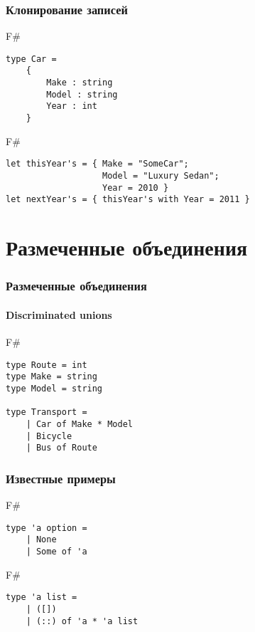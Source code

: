 \documentclass[xetex,mathserif,serif]{beamer}
\begin{document}
	\begin{frame}[fragile]
		\frametitle{Клонирование записей}
		\begin{exampleblock}{F\#}
			\begin{lstlisting}
type Car =
    {
        Make : string
        Model : string
        Year : int
    }
\end{lstlisting}
\end{exampleblock}
		
		\begin{exampleblock}{F\#}
			\begin{lstlisting}
let thisYear's = { Make = "SomeCar"; 
                   Model = "Luxury Sedan"; 
                   Year = 2010 }
let nextYear's = { thisYear's with Year = 2011 }
\end{lstlisting}
\end{exampleblock}
	
\end{frame}

	\section{Размеченные объединения}
	
	\begin{frame}[fragile]
		\frametitle{Размеченные объединения}
		\framesubtitle{Discriminated unions}
		\begin{exampleblock}{F\#}
			\begin{lstlisting}
type Route = int
type Make = string
type Model = string

type Transport =
    | Car of Make * Model
    | Bicycle
    | Bus of Route
\end{lstlisting}
\end{exampleblock}
		
\end{frame}

	\begin{frame}[fragile]
		\frametitle{Известные примеры}
		\begin{exampleblock}{F\#}
			\begin{lstlisting}
type 'a option =
    | None
    | Some of 'a
\end{lstlisting}
\end{exampleblock}

		\begin{exampleblock}{F\#}
			\begin{lstlisting}
type 'a list =
    | ([])
    | (::) of 'a * 'a list
\end{lstlisting}
\end{exampleblock}
		
\end{frame}
\end{document}
